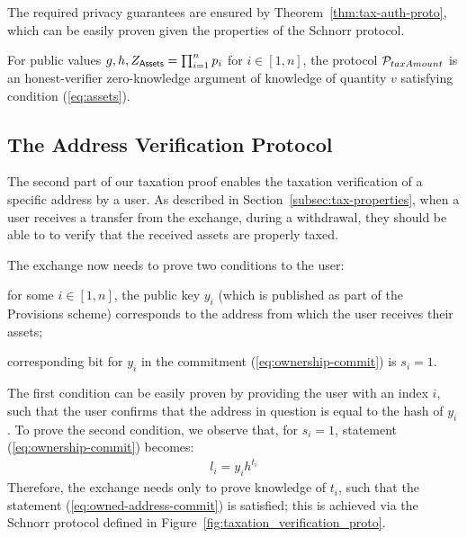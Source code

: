 The required privacy guarantees are ensured by
Theorem~\ref{thm:tax-auth-proto}, which can be easily proven given the
properties of the Schnorr protocol.

\begin{theorem}\label{thm:tax-auth-proto}
    For public values $g, h, Z_{\mathsf{Assets}} = \prod_{i = 1}^n p_i$ for $i \in [1,
    n]$, the protocol $\mathcal{P}_{taxAmount}$ is an honest-verifier zero-knowledge
    argument of knowledge of quantity $v$ satisfying condition (\ref{eq:assets}).
\end{theorem}

\subsection{The Address Verification Protocol}\label{subsec:user-verification-proto}

The second part of our taxation proof enables the taxation verification of a
specific address by a user. As described in Section~\ref{subsec:tax-properties}, when a
user receives a transfer from the exchange, \eg during a withdrawal, they
should be able to to verify that the received assets are properly taxed.

The exchange now needs to prove two conditions to the user:
\begin{inparaenum}[i)]
    \item for some $i \in [1, n]$, the public key $y_i$ (which is published as
        part of the Provisions scheme) corresponds to the address from which
        the user receives their assets;
    \item corresponding bit for $y_i$ in the commitment
        (\ref{eq:ownership-commit}) is $s_i = 1$.
\end{inparaenum}
The first condition can be easily proven by providing the user with an index
$i$, such that the user confirms that the address in question is equal to the
hash of $y_i$. To prove the second condition, we observe that, for $s_i = 1$,
statement (\ref{eq:ownership-commit}) becomes:
\begin{align}
    l_i = y_ih^{t_i} \label{eq:owned-address-commit}
\end{align}
Therefore, the exchange needs only to prove knowledge of $t_i$, such that the
statement (\ref{eq:owned-address-commit}) is satisfied; this is achieved via
the Schnorr protocol defined in Figure~\ref{fig:taxation_verification_proto}.

